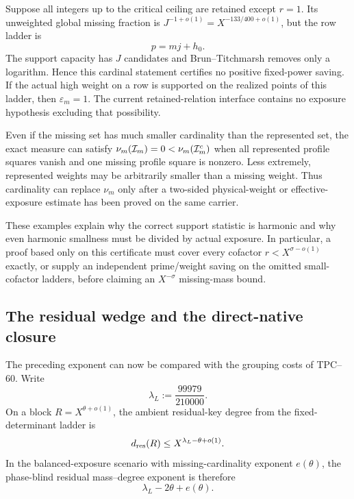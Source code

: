 \begin{example}
\label{ex:tpc61-one-small-cofactor}
Suppose all integers up to the critical ceiling are retained except
\(r=1\).  Its unweighted global missing fraction is
\(J^{-1+o(1)}=X^{-133/400+o(1)}\), but the row ladder is
\begin{equation}
 p=mj+h_0.
 \label{eq:tpc61-r-one-ladder}
\end{equation}
The support capacity has \(J\) candidates and Brun--Titchmarsh removes
only a logarithm.  Hence this cardinal statement certifies no positive
fixed-power saving.  If the actual high weight on a row is supported on
the realized points of this ladder, then \(\varepsilon_m=1\).  The current
retained-relation interface contains no exposure hypothesis excluding that
possibility.
\end{example}

\begin{example}
\label{ex:tpc61-weight-concentration}
Even if the missing set has much smaller cardinality than the represented
set, the exact measure can satisfy
\(\nu_m(\mathcal I_m)=0<\nu_m(\mathcal I_m^c)\) when all represented profile squares vanish
and one missing profile square is nonzero.  Less extremely, represented
weights may be arbitrarily smaller than a missing weight.  Thus cardinality
can replace \(\nu_m\) only after a two-sided physical-weight or effective-
exposure estimate has been proved on the same carrier.
\end{example}

These examples explain why the correct support statistic is harmonic and
why even harmonic smallness must be divided by actual exposure.  In
particular, a proof based only on this certificate must cover every
cofactor \(r<X^{\sigma-o(1)}\) exactly, or supply an independent
prime/weight saving on the omitted small-cofactor ladders, before claiming
an \(X^{-\sigma}\) missing-mass bound.

\subsection{The residual wedge and the direct-native closure}

The preceding exponent can now be compared with the grouping costs of
TPC--60.  Write
\begin{equation}
 \lambda_L:=\frac{99979}{210000}.
 \label{eq:tpc61-lambda-L}
\end{equation}
On a block \(R=X^{\theta+o(1)}\), the ambient residual-key degree from the
fixed-determinant ladder is
\begin{equation}
 d_{\rm res}(R)\le X^{\lambda_L-\theta+o(1)}.
 \label{eq:tpc61-residual-degree-exponent}
\end{equation}
In the balanced-exposure scenario with missing-cardinality exponent
\(e(\theta)\), the phase-blind residual mass--degree exponent is therefore
\begin{equation}
 \lambda_L-2\theta+e(\theta).
 \label{eq:tpc61-residual-product-exponent}
\end{equation}

